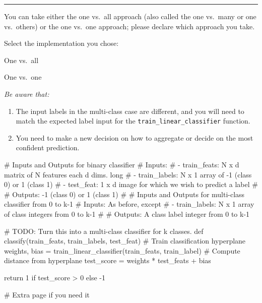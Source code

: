 \documentclass{csci1430}
\begin{document}
\vspace{2ex}
\hrule
\vspace{1ex}

You can take either the one vs.~all approach (also called the one vs.~many or one vs.~others) or the one vs.~one approach; please declare which approach you take.

Select the implementation you chose:

\begin{answerlist}
    \item One vs.~all %
    \item One vs.~one
\end{answerlist}

\emph{Be aware that:}
\begin{enumerate}
    \item The input labels in the multi-class case are different, and you will need to match the expected label input for the \texttt{train\_linear\_classifier} function.
    \item You need to make a new decision on how to aggregate or decide on the most confident prediction.
\end{enumerate}


\pagebreak
\begin{answer}[height=30]
\begin{python}
# Inputs and Outputs for binary classifier
# Inputs:
# - train_feats: N x d matrix of N features each d dims. long
# - train_labels: N x 1 array of -1 (class 0) or 1 (class 1)
# - test_feat: 1 x d image for which we wish to predict a label
#
# Outputs: -1 (class 0) or 1 (class 1)
#
# Inputs and Outputs for multi-class classifier from 0 to k-1
# Inputs: As before, except
# - train_labels: N x 1 array of class integers from 0 to k-1
# 
# Outputs: A class label integer from 0 to k-1

# TODO: Turn this into a multi-class classifier for k classes.
def classify(train_feats, train_labels, test_feat)
    # Train classification hyperplane
    weights, bias = train_linear_classifier(train_feats, train_label)
    # Compute distance from hyperplane
    test_score = weights * test_feats + bias

    return 1 if test_score > 0 else -1
    
\end{python}
\end{answer}


\pagebreak
\begin{answer}[height=40]
\begin{python}
# Extra page if you need it            
\end{python}
\end{answer}
\end{document}

